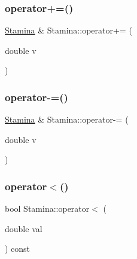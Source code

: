 \mbox{\label{classStamina_ac6c546b319bdeb9c82f83a0aa87b2894_ac6c546b319bdeb9c82f83a0aa87b2894}} 
\subsubsection{\texorpdfstring{operator+=()}{operator+=()}}
{\footnotesize\ttfamily \hyperlink{classStamina}{Stamina} \& Stamina\+::operator+= (\begin{DoxyParamCaption}\item[{double}]{v }\end{DoxyParamCaption})}

\mbox{\label{classStamina_afa57a14ac8fe63c95b9cc1a8ebd66945_afa57a14ac8fe63c95b9cc1a8ebd66945}} 
\subsubsection{\texorpdfstring{operator-\/=()}{operator-=()}}
{\footnotesize\ttfamily \hyperlink{classStamina}{Stamina} \& Stamina\+::operator-\/= (\begin{DoxyParamCaption}\item[{double}]{v }\end{DoxyParamCaption})}

\mbox{\label{classStamina_a4958bdadaf27115a1d458fc94939390a_a4958bdadaf27115a1d458fc94939390a}} 
\subsubsection{\texorpdfstring{operator$<$()}{operator<()}}
{\footnotesize\ttfamily bool Stamina\+::operator$<$ (\begin{DoxyParamCaption}\item[{double}]{val }\end{DoxyParamCaption}) const}

\mbox{\label{classStamina_a6bdebd03a3310fb1017661c0997484a0_a6bdebd03a3310fb1017661c0997484a0}} 
